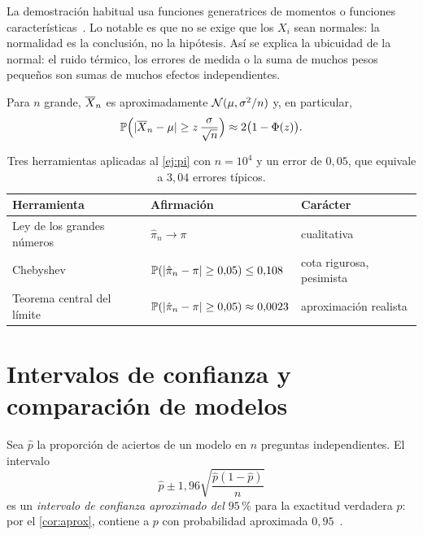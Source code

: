 La demostración habitual usa funciones generatrices de momentos o funciones características~\cite[§5.4]{bt}. Lo notable es que no se exige que los $X_i$ sean normales: la normalidad es la conclusión, no la hipótesis. Así se explica la ubicuidad de la normal: el ruido térmico, los errores de medida o la suma de muchos pesos pequeños son sumas de muchos efectos independientes.

\begin{corolario}\label{cor:aprox}
Para $n$ grande, $\overline{X}_n$ es aproximadamente $\mathcal{N}(\mu,\sigma^{2}/n)$ y, en particular,
\[
\mathbb{P}\Bigl(\lvert\overline{X}_n-\mu\rvert\ge z\,\frac{\sigma}{\sqrt n}\Bigr)\approx 2\bigl(1-\Phi(z)\bigr).
\]
\end{corolario}

\begin{table}[h]
\centering\small
\caption{Tres herramientas aplicadas al \cref{ej:pi} con $n=10^{4}$ y un error de $0{,}05$, que equivale a $3{,}04$ errores típicos.}\label{tab:herramientas}
\begin{tabular}{@{}lll@{}}
\toprule
Herramienta & Afirmación & Carácter \\
\midrule
Ley de los grandes números & $\hat\pi_n\to\pi$ & cualitativa \\
Chebyshev & $\mathbb{P}(\lvert\hat\pi_n-\pi\rvert\ge 0{,}05)\le 0{,}108$ & cota rigurosa, pesimista \\
Teorema central del límite & $\mathbb{P}(\lvert\hat\pi_n-\pi\rvert\ge 0{,}05)\approx 0{,}0023$ & aproximación realista \\
\bottomrule
\end{tabular}
\end{table}

\section{Intervalos de confianza y comparación de modelos}

\begin{definicion}
Sea $\hat p$ la proporción de aciertos de un modelo en $n$ preguntas independientes. El intervalo
\[
\hat p\pm 1{,}96\sqrt{\frac{\hat p(1-\hat p)}{n}}
\]
es un \emph{intervalo de confianza aproximado del $95\,\%$} para la exactitud verdadera $p$: por el \cref{cor:aprox}, contiene a $p$ con probabilidad aproximada $0{,}95$~\cite[clase~22]{mit1805}.
\end{definicion}

\addtocounter{definicion}{1}%

